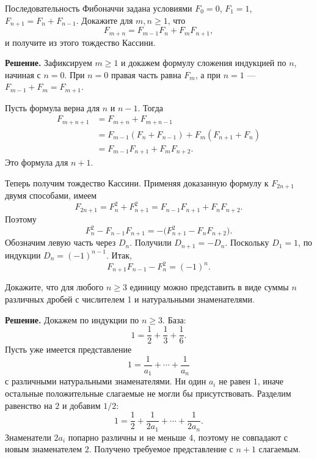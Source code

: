 \begin{problems}
\item Последовательность Фибоначчи задана условиями $F_0=0$, $F_1=1$, $F_{n+1}=F_n+F_{n-1}$. Докажите для $m,n\geqslant1$, что
\[
F_{m+n}=F_{m-1}F_n+F_mF_{n+1},
\]
и получите из этого тождество Кассини.
\par\smallskip\noindent\textbf{Решение.} Зафиксируем $m\ge1$ и докажем формулу сложения индукцией по $n$, начиная с $n=0$. При $n=0$ правая часть равна $F_m$, а при $n=1$ --- $F_{m-1}+F_m=F_{m+1}$.
\par Пусть формула верна для $n$ и $n-1$. Тогда
\[
\begin{aligned}
F_{m+n+1}
&=F_{m+n}+F_{m+n-1}\\
&=F_{m-1}(F_n+F_{n-1})+F_m(F_{n+1}+F_n)\\
&=F_{m-1}F_{n+1}+F_mF_{n+2}.
\end{aligned}
\]
Это формула для $n+1$.
\par Теперь получим тождество Кассини. Применяя доказанную формулу к $F_{2n+1}$ двумя способами, имеем
\[
F_{2n+1}=F_n^2+F_{n+1}^2
=F_{n-1}F_{n+1}+F_nF_{n+2}.
\]
Поэтому
\[
F_n^2-F_{n-1}F_{n+1}
=-\bigl(F_{n+1}^2-F_nF_{n+2}\bigr).
\]
Обозначим левую часть через $D_n$. Получили $D_{n+1}=-D_n$. Поскольку $D_1=1$, по индукции $D_n=(-1)^{n-1}$. Итак,
\[
\boxed{F_{n+1}F_{n-1}-F_n^2=(-1)^n}.
\]\par

\item Докажите, что для любого $n\geqslant3$ единицу можно представить в виде суммы $n$ различных дробей с числителем 1 и натуральными знаменателями.
\par\smallskip\noindent\textbf{Решение.} Докажем по индукции по $n\ge3$. База:
\[
1=\frac12+\frac13+\frac16.
\]
Пусть уже имеется представление
\[
1=\frac1{a_1}+\cdots+\frac1{a_n}
\]
с различными натуральными знаменателями. Ни один $a_i$ не равен $1$, иначе остальные положительные слагаемые не могли бы присутствовать. Разделим равенство на $2$ и добавим $1/2$:
\[
1=\frac12+\frac1{2a_1}+\cdots+\frac1{2a_n}.
\]
Знаменатели $2a_i$ попарно различны и не меньше $4$, поэтому не совпадают с новым знаменателем $2$. Получено требуемое представление с $n+1$ слагаемым.\par


\end{problems}
